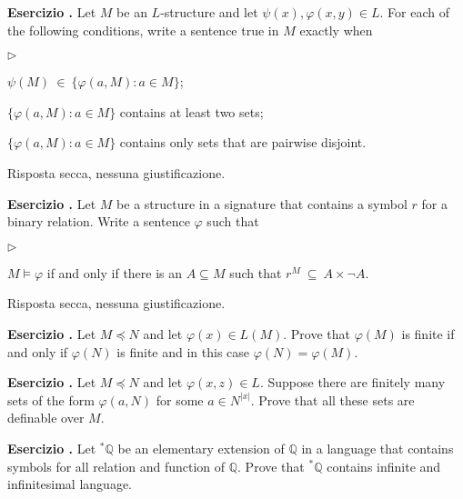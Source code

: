 \documentclass[10pt]{article}
\def\QQ{\mathds Q}
\newcommand{\labella}[1]{{\sf\footnotesize #1}\hfill}
\renewenvironment{itemize}
  {\begin{list}{$\triangleright$}{%
   \setlength{\parskip}{0mm}
   \setlength{\topsep}{0mm}
   \setlength{\rightmargin}{0mm}
   \setlength{\listparindent}{0mm}
   \setlength{\itemindent}{0mm}
   \setlength{\labelwidth}{3ex}
   \setlength{\itemsep}{0mm}
   \setlength{\parsep}{0mm}
   \setlength{\partopsep}{0mm}
   \setlength{\labelsep}{1ex}
   \setlength{\leftmargin}{\labelwidth+\labelsep}
   \let\makelabel\labella}}{%
   \end{list}}
\newcounter{ex}
\newenvironment{exercise}{\addtocounter{ex}{1}\textbf{Esercizio \theex.\quad}}{}
\begin{document}
\begin{exercise}
  Let $M$ be an $L$-structure and let $\psi(x), \varphi(x,y)\in L$. For each of the following conditions, write a sentence true in $M$ exactly when
  \begin{itemize}
  \item[a.] $\psi(M)\ \in\ \big\{\varphi(a,M): a\in M\big\}$;
  \item[b.] $\big\{\varphi(a,M): a\in M\big\}$ contains at least two sets;
  \item[c.] $\big\{\varphi(a,M): a\in M\big\}$ contains only sets that are pairwise disjoint.
  \end{itemize}
  Risposta secca, nessuna giustificazione.
\end{exercise}
  
\begin{exercise}
  Let $M$ be a structure in a signature that contains a symbol $r$ for a binary relation.
  Write a sentence $\varphi$ such that 
  \begin{itemize} 
  \item[a.] $M\models\varphi$ if and only if there is an $A\subseteq M$ such that $r^M\ \subseteq\ A\times\neg A$.
  \end{itemize}
  Risposta secca, nessuna giustificazione.
\end{exercise}


\begin{exercise}
  Let $M\preceq N$ and let $\varphi(x)\in L(M)$.
  Prove that $\varphi(M)$ is finite if and only if $\varphi(N)$ is finite and in this case $\varphi(N)=\varphi(M)$.
\end{exercise}
  
\begin{exercise}
  Let $M\preceq N$ and let $\varphi(x,z)\in L$.
  Suppose there are finitely many sets of the form $\varphi(a,N)$ for some $a\in N^{|x|}$.
  Prove that all these sets are definable over $M$.
\end{exercise}

\begin{exercise}
Let ${}^*\QQ$ be an elementary extension of $\QQ$ in a language that contains symbols for all relation and function of $\QQ$.
Prove that ${}^*\QQ$ contains infinite and infinitesimal language.
\end{exercise}
\end{document}
